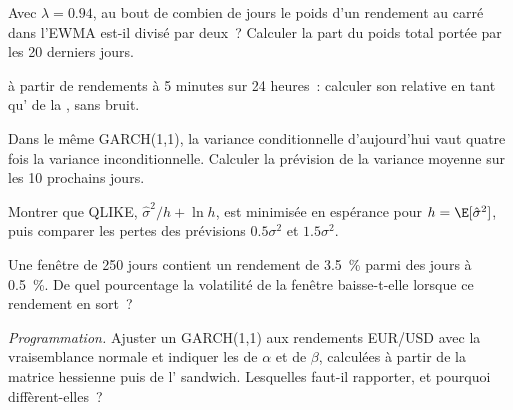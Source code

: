 \begin{exercise}[$\star$]\label{exo:qm:volatility-models:2}
Avec $\lambda = 0.94$, au bout de combien de jours le poids d'un rendement au carré dans l'EWMA est-il divisé par deux~? Calculer la part du poids total portée par les 20 derniers jours.
\end{exercise}

\begin{exercise}[$\star$]\label{exo:qm:volatility-models:3}
 à partir de rendements à 5 minutes sur 24 heures~: calculer son  relative en tant qu' de la , sans bruit.
\end{exercise}

\begin{exercise}[$\star\star$]\label{exo:qm:volatility-models:4}
Dans le même GARCH(1,1), la variance conditionnelle d'aujourd'hui vaut quatre fois la variance inconditionnelle. Calculer la prévision de la variance moyenne sur les 10 prochains jours.
\end{exercise}

\begin{exercise}[$\star\star$]\label{exo:qm:volatility-models:5}
Montrer que QLIKE, $\hat\sigma^2/h + \ln h$, est minimisée en espérance pour $h = \E[\hat\sigma^2]$, puis comparer les pertes des prévisions $0.5\sigma^2$ et $1.5\sigma^2$.
\end{exercise}

\begin{exercise}[$\star\star$]\label{exo:qm:volatility-models:6}
Une fenêtre de 250 jours contient un rendement de 3.5~\% parmi des jours à 0.5~\%. De quel pourcentage la volatilité de la fenêtre baisse-t-elle lorsque ce rendement en sort~?
\end{exercise}

\begin{exercise}[$\star\star\star$]\label{exo:qm:volatility-models:7}
\emph{Programmation.} Ajuster un GARCH(1,1) aux rendements EUR/USD avec la vraisemblance normale et indiquer les  de
$\alpha$ et de $\beta$, calculées à partir de la matrice hessienne puis de l' sandwich. Lesquelles faut-il rapporter, et pourquoi diffèrent-elles~?
\end{exercise}

